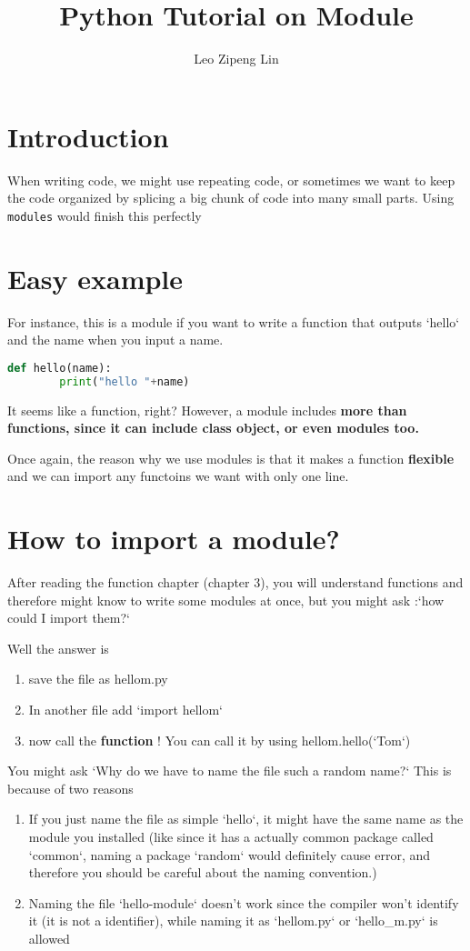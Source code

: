 \documentclass[12pt]{article}
\title{Python Tutorial on Module}
\author{Leo Zipeng Lin}
\begin{document}
\maketitle
\newpage
\section{Introduction}
\par When writing code, we might use repeating code, or sometimes we want to keep the code organized by splicing a big chunk of code into many small parts. Using \texttt{modules} would finish this perfectly
\section{Easy example}
For instance, this is a module if you want to write a function that outputs `hello` and the name when you input a name.
\begin{lstlisting}[language=python,caption=Simple example of module (function),pos=b]
def hello(name):
        print("hello "+name)
\end{lstlisting}

It seems like a function, right? However, a module includes \textbf{more than functions, since it can include class object, or even modules too.}

Once again, the reason why we use modules is that it makes a function \textbf{flexible} and we can import any functoins we want with only one line.
\section{How to import a module?}
After reading the function chapter (chapter 3), you will understand functions and therefore might know to write some modules at once, but you might ask :`how could I import them?`

Well the answer is
\begin{enumerate}
    \item save the file as hellom.py
    \item In another file add `import hellom`
    \item now call the \textbf{function} ! You can call it by using hellom.hello(`Tom`)
\end{enumerate}
        You might ask `Why do we have to name the file such a random name?` This is because of two reasons
        \begin{enumerate}
            \item If you just name the file as simple `hello`, it might have the
                same name as the module you installed (like since it has a
                actually common package called `common`, naming a package
                `random` would definitely cause error, and therefore you should be careful about the naming convention.)
            \item Naming the file `hello-module` doesn't work since the compiler won't identify it (it is not a identifier), while naming it as `hellom.py` or `hello\_m.py` is allowed
        \end{enumerate}
\end{document}
